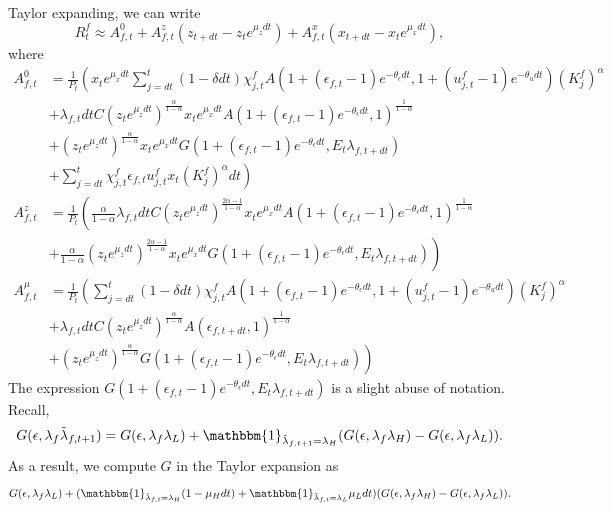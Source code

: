 Taylor expanding, we can write \[
R_t^f \approx A_{f, t}^0 + A_{f, t}^z (z_{t+dt} - z_t e^{\mu_z dt}) + A_{f, t}^x (x_{t+dt} - x_t e^{\mu_x dt}),
\]
where 
\begin{align*}
    A_{f, t}^0 &=  \frac{1}{P_t}\left(x_t e^{\mu_x dt} \sum_{ j = dt}^{t} (1 - \delta dt) \chi_{j, t}^f A\left(1 + (\epsilon_{f, t} - 1) e^{- \theta_{\epsilon} dt}, 1 + (u_{j, t}^f - 1) e^{- \theta_{u} dt}\right)( K_j^{f})^{\alpha} \right. \\
    & \left.+  \lambda_{f, t} dt C (z_t e^{\mu_z dt})^{\frac{\alpha}{1 - \alpha}} x_t e^{\mu_x dt} A(1 + (\epsilon_{f, t} - 1) e^{- \theta_{\epsilon} dt}, 1)^{\frac{1}{1 - \alpha}}\right.\\
 &\left.+ (z_t e^{\mu_z dt})^{\frac{\alpha}{1 - \alpha}} x_t e^{\mu_x dt} G(1 + (\epsilon_{f, t} - 1) e^{- \theta_{\epsilon} dt}, E_t \lambda_{f,t+dt})\right.\\
 & \left.+ \sum_{j = dt}^t\chi_{j, t}^{f} \epsilon_{f,t} u_{j,t}^{f} x_{t} (K_j^{f})^{\alpha} dt\right)\\
A_{f, t}^z &= \frac{1}{P_t} \left(\frac{\alpha}{1 - \alpha} \lambda_{f, t} dt C (z_t e^{\mu_z dt})^{\frac{2\alpha - 1}{1 - \alpha}} x_t e^{\mu_x dt} A(1 + (\epsilon_{f, t} - 1) e^{- \theta_{\epsilon} dt}, 1)^{\frac{1}{1 - \alpha}}\right.\\
 &\left.+\frac{\alpha}{1 - \alpha} (z_t e^{\mu_z dt})^{\frac{2 \alpha - 1}{1 - \alpha}} x_t e^{\mu_x dt} G(1 + (\epsilon_{f, t} - 1) e^{- \theta_{\epsilon} dt}, E_t \lambda_{f,t+dt}) \right)\\
A_{f, t}^{\mu} &= \frac{1}{P_t} \left( \sum_{ j = dt}^{t} (1 - \delta dt) \chi_{j, t}^f A\left(1 + (\epsilon_{f, t} - 1) e^{- \theta_{\epsilon} dt}, 1 + (u_{j, t}^f - 1) e^{- \theta_{u} dt}\right)( K_j^{f})^{\alpha} \right. \\
     &\left.+  \lambda_{f, t} dt C (z_t e^{\mu_z dt})^{\frac{\alpha}{1 - \alpha}}  A(\epsilon_{f, t+dt}, 1)^{\frac{1}{1 - \alpha}}\right.\\
 & \left.+ (z_t e^{\mu_z dt})^{\frac{\alpha}{1 - \alpha}}  G(1 + (\epsilon_{f, t} - 1) e^{- \theta_{\epsilon} dt}, E_t \lambda_{f,t+dt}) \right)
\end{align*}
The expression $G(1 + (\epsilon_{f, t} - 1) e^{- \theta_{\epsilon} dt}, E_t \lambda_{f,t+dt})$ is a slight abuse of notation. Recall, \[
G(\epsilon, \lambda_f \tilde\lambda_{f, t+1}) = 
G(\epsilon, \lambda_f \lambda_L)  + \mathbbm{1}_{\tilde \lambda_{f, t+1} =\lambda_H} (G(\epsilon, \lambda_f \lambda_H)-G(\epsilon, \lambda_f \lambda_L)).
\]
As a result, we compute $G$ in the Taylor expansion as 
\[G(\epsilon, \lambda_f \lambda_L)  + (\mathbbm{1}_{\tilde \lambda_{f, t} = \lambda_H}(1 - \mu_H dt) + \mathbbm{1}_{\tilde \lambda_{f, t} = \lambda_L} \mu_L dt) (G(\epsilon, \lambda_f \lambda_H)-G(\epsilon, \lambda_f \lambda_L)).\]

